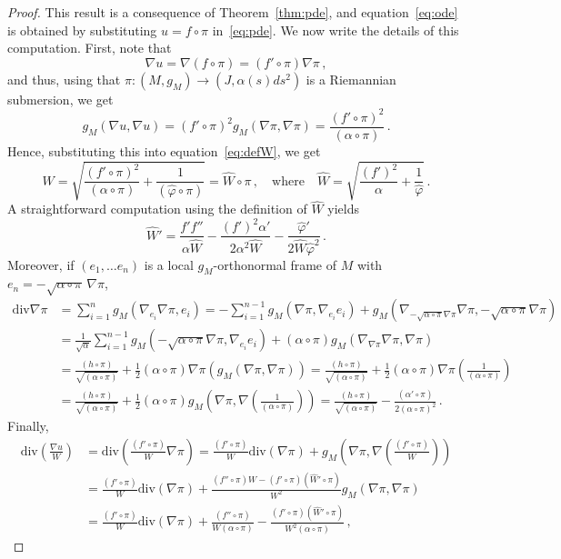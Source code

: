 \documentclass[oneside,12pt]{amsart}
\theoremstyle{definition}
\renewcommand{\div}{\mathrm{div}}
\begin{document}
\begin{proof}
This result is a consequence of Theorem~\ref{thm:pde}, and equation~\eqref{eq:ode} is obtained by substituting $u = f \circ \pi$ in~\eqref{eq:pde}. We now write the details of this computation. First, note that
\[ \nabla u = \nabla (f \circ \pi) = (f' \circ \pi)  \nabla \pi \, , \]
and thus, using that $\pi \colon (M,g_M) \to (J , \alpha(s) ds^2)$ is a Riemannian submersion, we get
\[ g_M \left( \nabla u , \nabla u \right) = (f' \circ \pi)^2 g_M \left( \nabla \pi , \nabla \pi \right) = \frac{(f' \circ \pi)^2}{(\alpha \circ \pi)} \, . \]
Hence, substituting this into equation~\eqref{eq:defW}, we get
\[ W = \sqrt{\frac{(f' \circ \pi)^2}{(\alpha \circ \pi)} + \frac{1}{(\widehat{\varphi} \circ \pi)}} = \widehat{W} \circ \pi \, , \quad \text{where} \quad \widehat{W} = \sqrt{\frac{(f')^2}{\alpha} + \frac{1}{\widehat{\varphi}}} \, . \]
A straightforward computation using the definition of $\widehat{W}$ yields
\[ \widehat{W}' = \frac{f' f''}{\alpha \widehat{W}} - \frac{(f')^2 \alpha'}{2 \alpha^2 \widehat{W}} - \frac{\widehat{\varphi}'}{2 \widehat{W} \widehat{\varphi}^2} \, . \]
Moreover, if $(e_1 , \dots e_n)$ is a local $g_M$-orthonormal frame of $M$ with $e_n = - \sqrt{\alpha \circ \pi} \, \nabla \pi$,
\begin{align*}
\div{\nabla \pi} &= \sum_{i=1}^{n} g_M \left( \nabla_{e_i} \nabla \pi , e_i \right) = - \sum_{i=1}^{n-1} g_M \left( \nabla \pi , \nabla_{e_i} e_i \right) + g_M \left( \nabla_{-\sqrt{\alpha \circ \pi} \nabla \pi} \nabla \pi , -\sqrt{\alpha \circ \pi} \nabla \pi \right) \\
&= \frac{1}{\sqrt{\alpha}} \sum_{i=1}^{n-1} g_M \left( - \sqrt{\alpha \circ \pi} \nabla \pi , \nabla_{e_i} e_i \right)  + (\alpha \circ \pi) g_M \left( \nabla_{\nabla \pi} \nabla \pi , \nabla \pi  \right) \\
&= \frac{(h \circ \pi)}{\sqrt{(\alpha \circ \pi)}} + \frac{1}{2}(\alpha \circ \pi) \nabla \pi \left( g_M \left( \nabla \pi , \nabla \pi \right) \right) = \frac{(h \circ \pi)}{\sqrt{(\alpha \circ \pi)}} + \frac{1}{2}(\alpha \circ \pi) \nabla \pi \left( \frac{1}{(\alpha \circ \pi)} \right) \\
&= \frac{(h \circ \pi)}{\sqrt{(\alpha \circ \pi)}} + \frac{1}{2}(\alpha \circ \pi) g_M \left( \nabla \pi , \nabla \left(\frac{1}{(\alpha \circ \pi)}\right) \right) = \frac{(h \circ \pi)}{\sqrt{(\alpha \circ \pi)}} - \frac{(\alpha' \circ \pi)}{2 (\alpha \circ \pi)^2} \, .
\end{align*}
Finally,  
\begin{align*}
\div \left( \frac{\nabla u}{W} \right) &= \div \left( \frac{(f' \circ \pi)}{W} \nabla \pi \right) = \frac{(f' \circ \pi)}{W} \div \left( \nabla \pi \right) + g_M \left( \nabla \pi , \nabla \left(\frac{(f' \circ \pi)}{W} \right) \right) \\
&= \frac{(f' \circ \pi)}{W} \div \left( \nabla \pi \right) + \frac{(f'' \circ \pi)W - (f' \circ \pi) (\widehat{W}' \circ \pi) }{W^2} g_M \left( \nabla \pi , \nabla \pi \right) \\
&= \frac{(f' \circ \pi)}{W} \div \left( \nabla \pi \right) + \frac{(f'' \circ \pi)}{W (\alpha \circ \pi)} - \frac{(f' \circ \pi)(\widehat{W}' \circ \pi)}{W^2 (\alpha \circ \pi)} \, ,
\end{align*}


\end{proof}
\end{document}

